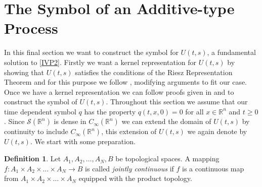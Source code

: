 \documentclass[a4paper, 12pt]{report}
\theoremstyle{cor}
\theoremstyle{remark}
\theoremstyle{definition}
\newtheorem{defn}[theorem]{Definition}
\begin{document}
\section{The Symbol of an Additive-type Process}

In this final section we want to construct the symbol for $U(t, s)$, a fundamental solution to \eqref{IVP2}.  Firstly we want a kernel representation for $U(t, s)$ by showing that $U(t, s)$ satisfies the conditions of the Riesz Representation Theorem and for this purpose we follow \cite{KernelPaper}, modifying arguments to fit our case.  Once we have a kernel representation we can follow proofs given in \cite{SymbolPaper} and \cite{Conservative} to construct the symbol of $U(t, s)$.  Throughout this section we assume that our time dependent symbol $q$ has the property $q(t, x, 0) = 0$ for all $x \in \mathbb{R}^n$ and $t \ge 0$.  Since $\mathcal{S}(\mathbb{R}^n)$ is dense in $C_\infty(\mathbb{R}^n)$ we can extend the domain of $U(t, s)$ by continuity to include $C_\infty(\mathbb{R}^n)$, this extension of $U(t, s)$ we again denote by $U(t, s)$.  We start with some preparation.
\begin{defn}
Let $A_1, A_2, \dots, A_N, B$ be topological spaces.  A mapping $f : A_1 \times A_2 \times \dots \times A_N \to B$ is called \emph{jointly continuous} if $f$ is a continuous map from $A_1 \times A_2 \times \dots \times A_N$ equipped with the product topology.
\end{defn}
\end{document}
